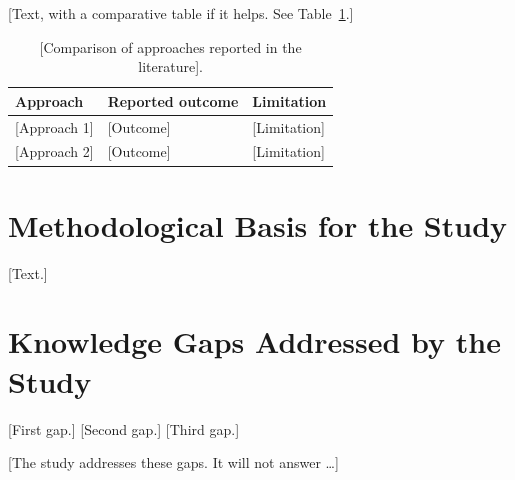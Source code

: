 {[}Text, with a comparative table if it helps. See Table~\ref{tab:2.1}.]

\begin{table}[htbp]
  \centering
  \caption{[Comparison of approaches reported in the literature].}
  \label{tab:2.1}
  \footnotesize
  \begin{tabularx}{\textwidth}{@{}p{} p{} X@{}}
    \toprule
    \textbf{Approach} & \textbf{Reported outcome} & \textbf{Limitation} \\
    \midrule
    {[}Approach 1] & {[}Outcome] & {[}Limitation] \\
    {[}Approach 2] & {[}Outcome] & {[}Limitation] \\
    \bottomrule
  \end{tabularx}
\end{table}

\section{Methodological Basis for the Study}\label{sec:2.4}

{[}Text.]

\section{Knowledge Gaps Addressed by the Study}\label{sec:2.5}

{[}First gap.] [Second gap.] [Third gap.]

{[}The study addresses these gaps. It will not answer \ldots]
